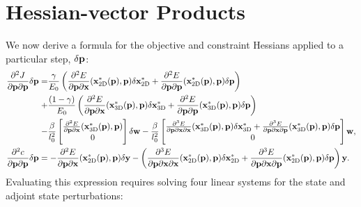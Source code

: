 \documentclass[10pt]{article}
\providecommand{\spder}[3]{\frac{\partial^2 #1}{\partial #2 \partial #3}}
\providecommand{\tpder}[4]{\frac{\partial^3 #1}{\partial #2 \partial #3 \partial #4}}
\renewcommand{\vec}[1]{{\bf #1}}
\def\x{\vec{x}}
\def\y{\vec{y}}
\def\w{\vec{w}}
\def\p{\vec{p}}
\def\xflat{\vec{x}^*_\text{2D}}
\def\xdeploy{\vec{x}^*_\text{3D}}
\def\delp{\delta \p}
\def\delxflat{\delta \xflat}
\def\delxdeploy{\delta \xdeploy}
\def\delw{\delta \w}
\def\dely{\delta \y}
\begin{document}
\section{Hessian-vector Products}
We now derive a formula for the objective and constraint Hessians applied to a particular step, $\delp$:
\begin{align*}
    &\begin{aligned}
        \spder{J}{\p}{\p} \delp =
        &\frac{\gamma}{E_0} \left(\spder{E}{\p}{\x} (\xflat(\p), \p) \delxflat + \spder{E}{\p}{\p}(\xflat(\p), \p) \delp\right) \\
        + &\frac{(1 - \gamma)}{E_0} \left(\spder{E}{\p}{\x} (\xdeploy(\p), \p) \delxdeploy + \spder{E}{\p}{\p}(\xdeploy(\p), \p) \delp\right) \\
        - &\frac{\beta}{l_0^2} \begin{bmatrix} \spder{E}{\p}{\x}(\xdeploy(\p), \p) \\ 0 \end{bmatrix} \delw 
            - \frac{\beta}{l_0^2} \begin{bmatrix} \tpder{E}{\p}{\x}{\x}(\xdeploy(\p), \p) \delxdeploy +\tpder{E}{\p}{\x}{\p}(\xdeploy(\p), \p) \delp  \\ 0 \end{bmatrix} \w, 
    \end{aligned} \\
    &\begin{aligned}
        \spder{c}{\p}{\p} \delp = -\spder{E}{\p}{\x}(\xflat(\p), \p)\dely - \left(\tpder{E}{\p}{\x}{\x}(\xflat(\p), \p) \delxflat + \tpder{E}{\p}{\x}{\p}(\xflat(\p), \p) \delp \right) \y.
    \end{aligned}
\end{align*}
Evaluating this expression requires solving four linear systems for the state and adjoint state perturbations:
\end{document}
